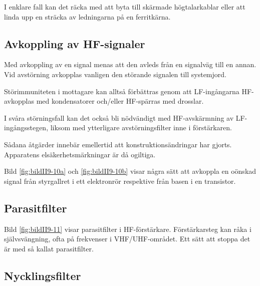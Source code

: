 I enklare fall kan det räcka med att byta till skärmade högtalarkablar
eller att linda upp en sträcka av ledningarna på en ferritkärna.

\subsection{Avkoppling av HF-signaler}




Med avkoppling av en signal menas att den avleds från en signalväg till en
annan.
Vid avstörning avkopplas vanligen den störande signalen till systemjord.

Störimmuniteten i mottagare kan alltså förbättras genom att LF-ingångarna
HF-avkopplas med kondensatorer och/eller HF-spärras med drosslar.

I svåra störningsfall kan det också bli nödvändigt med HF-avskärmning av
LF-ingångsstegen, liksom med ytterligare avstörningsfilter inne i förstärkaren.

Sådana åtgärder innebär emellertid att konstruktionsändringar har gjorts.
Apparatens elsäkerhetsmärkningar är då ogiltiga.

Bild \ref{fig:bildII9-10a} och \ref{fig:bildII9-10b} visar några sätt att
avkoppla en oönskad signal från styrgallret i ett elektronrör respektive från
basen i en transistor.

\subsection{Parasitfilter}

Bild \ref{fig:bildII9-11} visar parasitfilter i HF-förstärkare.
Förstärkarsteg kan råka i självsvängning, ofta på frekvenser i VHF/UHF-området.
Ett sätt att stoppa det är med så kallat parasitfilter.

\subsection{Nycklingsfilter}
\label{Nycklingsfilter}

